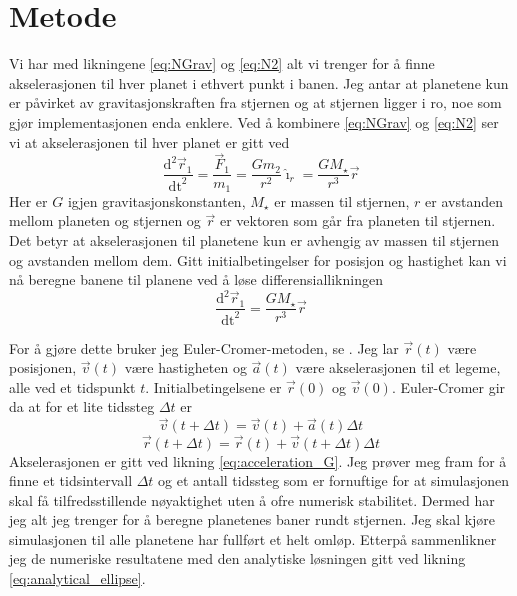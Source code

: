 \documentclass[reprint,english,notitlepage]{revtex4-1}  %
\begin{document}
\section{Metode}

Vi har med likningene \ref{eq:NGrav} og \ref{eq:N2} alt vi trenger for å finne akselerasjonen til
 hver planet i ethvert punkt i banen. Jeg antar at planetene kun er påvirket av gravitasjonskraften fra stjernen og at stjernen ligger i ro, noe som gjør implementasjonen enda enklere. Ved å kombinere \ref{eq:NGrav} og \ref{eq:N2} ser vi at akselerasjonen til hver planet er gitt ved
 \begin{equation}
   \label{eq:acceleration_G}
   \frac{\mathrm{d}^2 \vec{r}_1}{\mathrm{dt}^2} = \frac{\vec{F}_1}{m_1} = \frac{G m_2}{r^2} \hat{\imath}_r = \frac{G M_{\star}}{r^3} \vec{r}
 \end{equation}
 Her er $G$ igjen gravitasjonskonstanten, $M_{\star}$ er massen til stjernen, $r$ er avstanden mellom planeten og stjernen og $\vec{r}$ er vektoren som går fra planeten til stjernen. Det betyr at akselerasjonen til planetene kun er avhengig av massen til stjernen og avstanden mellom dem. Gitt initialbetingelser for posisjon og hastighet kan vi nå beregne banene til planene ved å løse differensiallikningen
 \[\frac{\mathrm{d}^2 \vec{r}_1}{\mathrm{dt}^2} = \frac{G M_{\star}}{r^3} \vec{r}\]

For å gjøre dette bruker jeg Euler-Cromer-metoden, se \citep{part1B}. Jeg lar $\vec{r}(t)$
 være posisjonen, $\vec{v}(t)$ være hastigheten og $\vec{a}(t)$ være akselerasjonen til et legeme, alle ved et tidspunkt $t$. Initialbetingelsene er $\vec{r}(0)$ og $\vec{v}(0)$. Euler-Cromer gir da at for et lite tidssteg $\Delta t$ er
 \begin{equation}
   \label{eq:EC_vel}
   \vec{v}(t + \Delta t) = \vec{v}(t) + \vec{a}(t) \Delta t
 \end{equation}
 \begin{equation}
   \label{eq:EC_pos}
   \vec{r}(t + \Delta t) = \vec{r}(t) + \vec{v}(t + \Delta t) \Delta t
 \end{equation}
 Akselerasjonen er gitt ved likning \ref{eq:acceleration_G}. Jeg prøver meg fram for å finne et tidsintervall $\Delta t$ og et antall tidssteg som er fornuftige for at simulasjonen skal få tilfredsstillende nøyaktighet uten å ofre numerisk stabilitet. Dermed har jeg alt jeg trenger for å beregne planetenes baner rundt stjernen. Jeg skal kjøre simulasjonen til alle planetene har fullført et helt omløp. Etterpå sammenlikner jeg de numeriske resultatene med den analytiske løsningen gitt ved likning \ref{eq:analytical_ellipse}.
\end{document}
